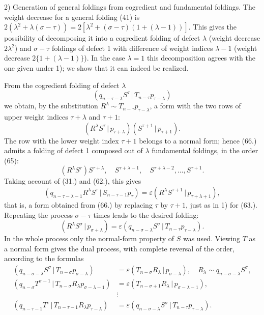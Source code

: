 \documentclass[11pt]{article}
\newcommand{\pair}[2]{(#1\,|\,#2)}
\newcommand{\eps}{\varepsilon}
\begin{document}
2) Generation of general foldings from cogredient and fundamental foldings. The weight decrease for a general folding (41) is $2(\lambda^2+\lambda(\sigma-\tau))=2[\lambda^2+(\sigma-\tau)(1+(\lambda-1))]$. This gives the possibility of decomposing it into a cogredient folding of defect $\lambda$ (weight decrease $2\lambda^2$) and $\sigma-\tau$ foldings of defect 1 with difference of weight indices $\lambda-1$ (weight decrease $2\{1+(\lambda-1)\}$). In the case $\lambda=1$ this decomposition agrees with the one given under 1); we show that it can indeed be realized.

From the cogredient folding of defect $\lambda$
\[
 \pair{q_{n-\tau-\lambda}S^\tau}{T_{n-\tau}p_{\tau-\lambda}}
\]
we obtain, by the substitution $R^\lambda\sim T_{n-\tau}p_{\tau-\lambda}$, a form with the two rows of upper weight indices $\tau+\lambda$ and $\tau+1$:
\begin{equation}
 \pair{R^\lambda S^\tau}{p_{\tau+\lambda}}\pair{S^{\tau+1}}{p_{\tau+1}}.
\tag{66}
\end{equation}
The row with the lower weight index $\tau+1$ belongs to a normal form; hence (66.) admits a folding of defect 1 composed out of $\lambda$ fundamental foldings, in the order (65):
\[
 (R^\lambda S^\tau)S^{\tau+\lambda},\quad S^{\tau+\lambda-1},\quad S^{\tau+\lambda-2},\ldots,S^{\tau+1}.
\]
Taking account of (31.) and (62.), this gives
\[
 \pair{q_{n-\tau-\lambda-1}R^\lambda S^\tau}{S_{n-\tau-1}p_\tau}=\eps\pair{R^\lambda S^{\tau+1}}{p_{\tau+\lambda+1}},
\]
that is, a form obtained from (66.) by replacing $\tau$ by $\tau+1$, just as in 1) for (63.). Repeating the process $\sigma-\tau$ times leads to the desired folding:
\[
 \pair{R^\lambda S^\sigma}{p_{\sigma+\lambda}}=\eps\pair{q_{n-\sigma-\lambda}S^\sigma}{T_{n-\tau}p_{\tau-\lambda}}.
\]
In the whole process only the normal-form property of $S$ was used. Viewing $T$ as a normal form gives the dual process, with complete reversal of the order, according to the formulas
\begin{align*}
\pair{q_{n-\sigma-\lambda}S^\sigma}{T_{n-\sigma}p_{\sigma-\lambda}}&=\eps\pair{T_{n-\sigma}R_\lambda}{p_{\sigma-\lambda}},\quad R_\lambda\sim q_{n-\sigma-\lambda}S^\sigma,\\
\pair{q_{n-\sigma}T^{\sigma-1}}{T_{n-\sigma}R_\lambda p_{\sigma-\lambda-1}}&=\eps\pair{T_{n-\sigma+1}R_\lambda}{p_{\sigma-\lambda-1}},\\
&\vdots\\
\pair{q_{n-\tau-1}T^\tau}{T_{n-\tau-1}R_\lambda p_{\tau-\lambda}}&=\eps\pair{q_{n-\sigma-\lambda}S^\sigma}{T_{n-\tau}p_{\tau-\lambda}}.
\end{align*}
\end{document}

